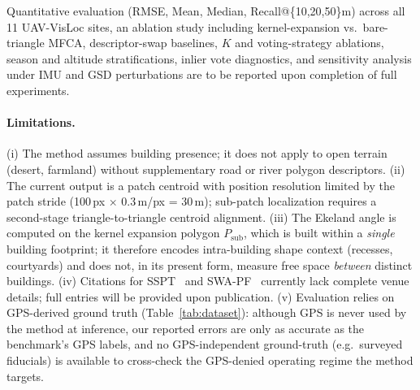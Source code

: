 \documentclass[10pt]{article}
\theoremstyle{plain}
\theoremstyle{definition}
\begin{document}
Quantitative evaluation (RMSE, Mean, Median, Recall@\{10,20,50\}m) across
all 11 UAV-VisLoc sites, an ablation study including kernel-expansion vs.\
bare-triangle MFCA, descriptor-swap baselines, $K$ and voting-strategy
ablations, season and altitude stratifications, inlier vote diagnostics,
and sensitivity analysis under IMU and GSD perturbations are to be reported
upon completion of full experiments.

\paragraph{Limitations.}
(i) The method assumes building presence; it does not apply to open terrain
(desert, farmland) without supplementary road or river polygon descriptors.
(ii) The current output is a patch centroid with position resolution limited
by the patch stride (100\,px $\times$ 0.3\,m/px = 30\,m); sub-patch
localization requires a second-stage triangle-to-triangle centroid alignment.
(iii) The Ekeland angle is computed on the kernel expansion polygon
$P_{\mathrm{sub}}$, which is built within a \emph{single} building footprint;
it therefore encodes intra-building shape context (recesses, courtyards) and
does not, in its present form, measure free space \emph{between} distinct
buildings.
(iv) Citations for SSPT~\cite{fan2024sspt} and SWA-PF~\cite{yuan2025swapf}
currently lack complete venue details; full entries will be provided upon
publication.
(v) Evaluation relies on GPS-derived ground truth (Table~\ref{tab:dataset}):
although GPS is never used by the method at inference, our reported errors are
only as accurate as the benchmark's GPS labels, and no GPS-independent
ground-truth (e.g.\ surveyed fiducials) is available to cross-check the
GPS-denied operating regime the method targets.

\FloatBarrier


\end{document}
